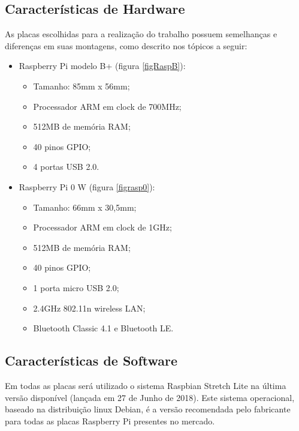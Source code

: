 \subsection{Características de Hardware}
\quad As placas escolhidas para a realização do trabalho possuem semelhanças e diferenças em suas montagens, como descrito nos tópicos a seguir:
\begin{itemize}
  \item Raspberry Pi modelo B+ (figura \ref{figRaspB}):
  \begin{itemize}
    \item Tamanho: 85mm x 56mm;
    \item Processador ARM em clock de 700MHz;
    \item 512MB de memória RAM;
    \item 40 pinos GPIO;
    \item 4 portas USB 2.0.
  \end{itemize}
  \item Raspberry Pi 0 W (figura \ref{figrasp0}):
  \begin{itemize}
    \item Tamanho: 66mm x 30,5mm;
    \item Processador ARM em clock de 1GHz;
    \item 512MB de memória RAM;
    \item 40 pinos GPIO;
    \item 1 porta micro USB 2.0;
    \item 2.4GHz 802.11n wireless LAN;
    \item Bluetooth Classic 4.1 e Bluetooth LE.
  \end{itemize}
\end{itemize}
\subsection{Características de Software}
\quad Em todas as placas será utilizado o sistema Raspbian Stretch Lite na última versão disponível (lançada em 27 de Junho de 2018).
Este sistema operacional, baseado na distribuição linux Debian, é a versão recomendada pelo fabricante para todas as placas Raspberry Pi presentes no mercado.
